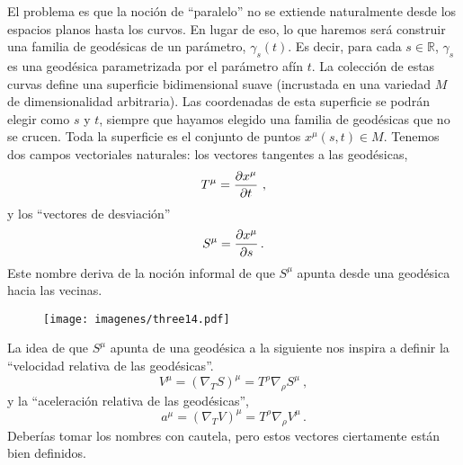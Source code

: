 \documentclass[11pt,b5paper,openany,twoside]{book}
\newcommand{\R}{\mathbb{R}}
\begin{document}
El problema es que la noción de ``paralelo'' no se extiende naturalmente desde los espacios planos hasta los curvos.
En lugar de eso, lo que haremos será construir una familia de geodésicas de un parámetro, $\gamma_s(t)$.
Es decir, para cada $s\in\R$, $\gamma_s$ es una geodésica parametrizada por el parámetro afín $t$.
La colección de estas curvas define una superficie bidimensional suave (incrustada en una variedad $M$ de dimensionalidad arbitraria).
Las coordenadas de esta superficie se podrán elegir como $s$ y $t$, siempre que hayamos elegido una familia de geodésicas que no se crucen.
Toda la superficie es el conjunto de puntos $x^\mu(s,t)\in M$.
Tenemos dos campos vectoriales naturales: los vectores tangentes a las geodésicas,
\begin{equation}
T^\mu = {{\partial x^\mu}\over{\partial t}}\ ,\label{3.107}
\end{equation}
y los ``vectores de desviación''
\begin{equation}
S^\mu = {{\partial x^\mu}\over{\partial s}}\,.\label{3.108}
\end{equation}
Este nombre deriva de la noción informal de que $S^\mu$ apunta desde una geodésica hacia las vecinas.

\begin{figure}[h]
\centering
\texttt{[image: imagenes/three14.pdf]}
\end{figure}

La idea de que $S^\mu$ apunta de una geodésica a la siguiente nos inspira a definir la ``velocidad relativa de las geodésicas''.
\begin{equation}
V^\mu = (\nabla_TS)^\mu = T^\rho\nabla_\rho S^\mu\ ,\label{3.109}
\end{equation}
y la ``aceleración relativa de las geodésicas'',
\begin{equation}
a^\mu = (\nabla_T V)^\mu =T^\rho\nabla_\rho V^\mu\,.\label{3.110}
\end{equation}
Deberías tomar los nombres con cautela, pero estos vectores ciertamente están bien definidos.
\end{document}
